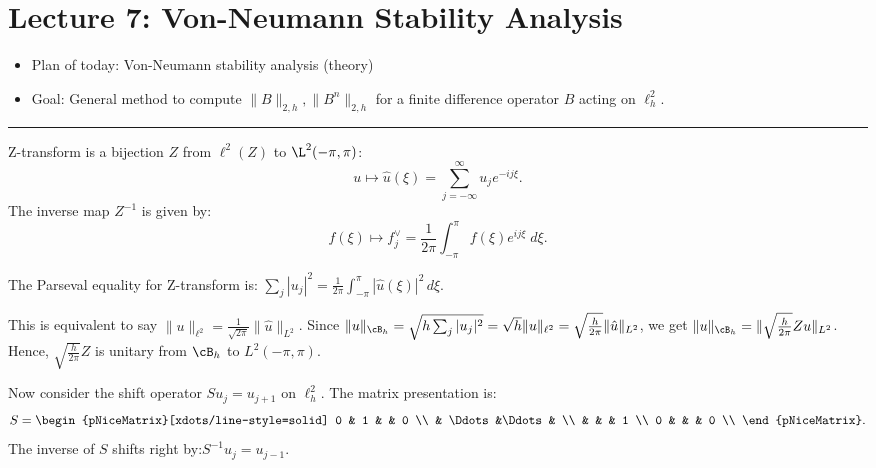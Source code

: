 \newpage
\section{Lecture 7: Von-Neumann Stability Analysis} 
\begin{itemize}
    \item Plan of today: Von-Neumann stability analysis (theory)
    \item Goal: General method to compute $\|B\|_{2,h}, \|B^n\|_{2,h}$ for a finite difference operator $B$ acting on $\ell _h^2$.
\end{itemize}
\vspace{1em}
\hrule


\begin{definition}
[Z-transform]
\label{def: Z-transform}
Z-transform is a bijection $Z$ from $\ell^2(Z)$ to $\L^2(-\pi,\pi)$: 
\[
    u \mapsto \hat u (\xi ) = \sum_{j=-\infty}^\infty u_j e^{-ij \xi }.  
\]
The inverse map $Z^{-1}$ is given by: 
\[
    f(\xi ) \mapsto f_j^{\vee} = \frac{1}{2\pi } \int_{-\pi }^{\pi} f(\xi ) e^{ij \xi}\; d\xi. 
\]
\end{definition}


\begin{proposition}
[Parseval]
\label{prop: Parseval}
The Parseval equality for Z-transform is: $\sum_j |u_j|^2 = \frac{1}{2\pi } \int_{-\pi}^\pi |\hat u (\xi )|^2 \, d \xi.$ 
\end{proposition}
This is equivalent to say $\|u\|_{\ell^2} = \frac{1}{\sqrt{2\pi } } \|\hat u\|_{L^2}$. Since $\|u\|_{\cB_h} = \sqrt{h \sum_{j}|u_j|^2} = \sqrt{h}\|u\|_{\ell ^2} = \sqrt{\frac{h}{2\pi }}  \|\hat u \|_{L^2}$, we get $\|u\|_{\cB_h} = \|\sqrt{\frac{h}{2\pi } }Zu\|_{L^2}$. Hence, $\sqrt{\frac{h}{2\pi }} Z$ is unitary from $\cB_h$ to $L^2(-\pi ,\pi )$.  

Now consider the shift operator $S{u_j} = u_{j+1}$ on $\ell_h^2$. The matrix presentation is: 
\[
S = \begin{pNiceMatrix}[xdots/line-style=solid]
    0  & 1 &   & 0      \\
          & \Ddots &\Ddots   & \\
     &  & & 1 \\
    0      & &  & 0  \\
   \end{pNiceMatrix}. 
\]
The inverse of $S$ shifts right by:$S^{-1}u_j = u_{j-1}$.  


